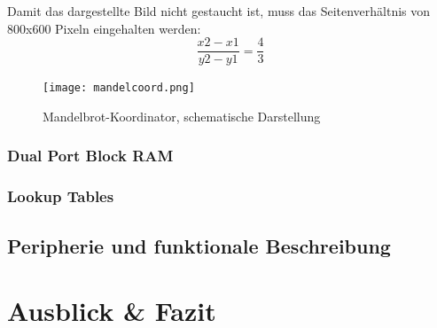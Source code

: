 \documentclass[a4paper,12pt,onesided]{report}
\begin{document}
Damit das dargestellte Bild nicht gestaucht ist, muss das Seitenverhältnis von 800x600 Pixeln eingehalten werden:
\[\frac{x2-x1}{y2-y1}=\frac{4}{3}\]
\begin{figure}[H]
	\centering
	\texttt{[image: mandelcoord.png]}
	\caption{Mandelbrot-Koordinator, schematische Darstellung}
	\label{fig:mandelcoordpixels}
\end{figure}

\subsection{Dual Port Block RAM}
\label{subsec:ram}

\subsection{Lookup Tables}
\section{Peripherie und funktionale Beschreibung}

\chapter{Ausblick \& Fazit}

{}

\end{document}
